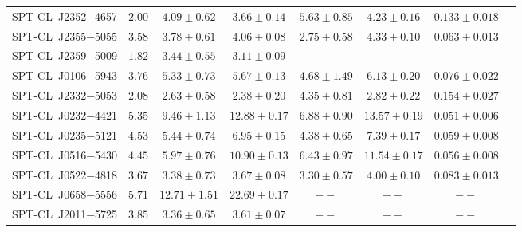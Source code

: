 \begin{table}
{\begin{tabular}{lccccccc}
    SPT-CL~J2352$-$4657    &$ 2.00 $    &$ 4.09 \pm 0.62 $    &$ 3.66 \pm 0.14 $    &$ 5.63 \pm 0.85 $     &$ 4.23 \pm 0.16 $    &$ 0.133 \pm 0.018 $    \\ 
    SPT-CL~J2355$-$5055    &$ 3.58 $    &$ 3.78 \pm 0.61 $    &$ 4.06 \pm 0.08 $    &$ 2.75 \pm 0.58 $     &$ 4.33 \pm 0.10 $    &$ 0.063 \pm 0.013 $    \\ 
    SPT-CL~J2359$-$5009    &$ 1.82 $    &$ 3.44 \pm 0.55 $    &$ 3.11 \pm 0.09 $    &$       --      $     &$       --      $    &$       --      $    \\ 
    SPT-CL~J0106$-$5943    &$ 3.76 $    &$ 5.33 \pm 0.73 $    &$ 5.67 \pm 0.13 $    &$ 4.68 \pm 1.49 $     &$ 6.13 \pm 0.20 $    &$ 0.076 \pm 0.022 $    \\ 
    SPT-CL~J2332$-$5053    &$ 2.08 $    &$ 2.63 \pm 0.58 $    &$ 2.38 \pm 0.20 $    &$ 4.35 \pm 0.81 $     &$ 2.82 \pm 0.22 $    &$ 0.154 \pm 0.027 $    \\ 
    SPT-CL~J0232$-$4421    &$ 5.35 $    &$ 9.46 \pm 1.13 $    &$ 12.88 \pm 0.17 $    &$ 6.88 \pm 0.90 $     &$ 13.57 \pm 0.19 $    &$ 0.051 \pm 0.006 $    \\ 
    SPT-CL~J0235$-$5121    &$ 4.53 $    &$ 5.44 \pm 0.74 $    &$ 6.95 \pm 0.15 $    &$ 4.38 \pm 0.65 $     &$ 7.39 \pm 0.17 $    &$ 0.059 \pm 0.008 $    \\ 
    SPT-CL~J0516$-$5430    &$ 4.45 $    &$ 5.97 \pm 0.76 $    &$ 10.90 \pm 0.13 $    &$ 6.43 \pm 0.97 $     &$ 11.54 \pm 0.17 $    &$ 0.056 \pm 0.008 $    \\ 
    SPT-CL~J0522$-$4818    &$ 3.67 $    &$ 3.38 \pm 0.73 $    &$ 3.67 \pm 0.08 $    &$ 3.30 \pm 0.57 $     &$ 4.00 \pm 0.10 $    &$ 0.083 \pm 0.013 $    \\ 
    SPT-CL~J0658$-$5556    &$ 5.71 $    &$ 12.71 \pm 1.51 $    &$ 22.69 \pm 0.17 $    &$       --      $     &$       --      $    &$       --      $    \\ 
    SPT-CL~J2011$-$5725    &$ 3.85 $    &$ 3.36 \pm 0.65 $    &$ 3.61 \pm 0.07 $    &$       --      $     &$       --      $    &$       --      $    \\ 
    \end{tabular}
    }
    \end{table}